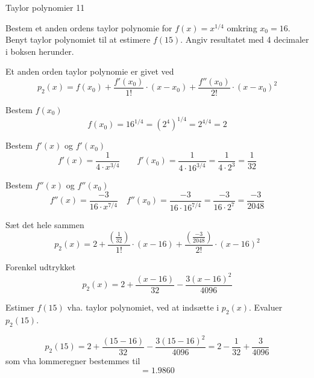 \documentclass{article}
\begin{document}
\begin{exercise}{Taylor polynomier 11}

Bestem et anden ordens taylor polynomie for $f(x) =x^{1/4}$
omkring $x_0 = 16$.
Benyt taylor polynomiet til at estimere $f(15)$.
Angiv resultatet med 4 decimaler i boksen herunder.

\lommeregnertilladt

\hint
Et anden orden taylor polynomie
er givet ved
\[
p_2(x) = f(x_0) + \frac{f'(x_0)}{1!} \cdot (x - x_0)
+ \frac{f''(x_0)}{2!} \cdot (x - x_0)^2
\]


\hint
Bestem $f(x_0)$
\[
f(x_0) = 16^{1/4} = \left(2^4\right)^{1/4} = 2^{4/4} = 2
\]

\hint
Bestem $f'(x)$ og $f'(x_0)$
\[
f'(x) = \frac{1}{4 \cdot x^{3/4}} \qquad f'(x_0) = \frac{1}{4 \cdot 16^{3/4}} = \frac{1}{4 \cdot 2^3} = \frac{1}{32}
\]

\hint
Bestem $f''(x)$ og $f''(x_0)$
\[
f''(x) =\frac{-3}{16 \cdot x^{7/4}} \quad f''(x_0) = \frac{-3}{16 \cdot 16^{7/4}} = \frac{-3}{16 \cdot 2^7} = \frac{-3}{2048}
\]


\hint
Sæt det hele sammen
\[
p_2(x) = 2 + \frac{ \left(\frac{1}{32} \right)}{1!} \cdot (x - 16) + \frac{ \left( \frac{-3}{2048}\right)}{2!} \cdot (x - 16)^2
\]

\hint
Forenkel udtrykket
\[
p_2(x) = 2 + \frac{(x - 16)}{32} - \frac{3(x - 16)^2}{4096}
\]

\hint
Estimer $f(15)$ vha. taylor polynomiet, ved at indsætte i $p_2(x)$.
Evaluer $p_2(15)$.

\hint
\[
p_2(15) = 2 + \frac{(15 - 16)}{32} - \frac{3(15 - 16)^2}{4096} = 2 - \frac{1}{32} + \frac{3}{4096}
\]
som vha lommeregner bestemmes til
\[
= 1.9860
\]
\end{exercise}
\end{document}
